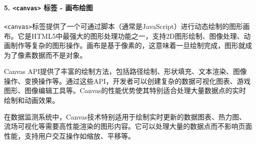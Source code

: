 \paragraph{\texorpdfstring{5. \texttt{\textless{}canvas\textgreater{}} 标签 - 画布绘图}{5. \textless canvas\textgreater{} 标签 - 画布绘图}}\label{canvas-ux6807ux7b7e---ux753bux5e03ux7ed8ux56fe}

\texttt{\textless{}canvas\textgreater{}}标签提供了一个可通过脚本（通常是JavaScript）进行动态绘制的图形画布。它是HTML5中最强大的图形处理功能之一，支持2D图形绘制、图像处理、动画制作等复杂的图形操作。画布是基于像素的，这意味着一旦绘制完成，图形就成为了像素数据而不是对象。

Canvas API提供了丰富的绘制方法，包括路径绘制、形状填充、文本渲染、图像操作、变换操作等。通过这些API，开发者可以创建复杂的数据可视化图表、游戏图形、图像编辑工具等。Canvas的性能优势使其特别适合处理大量数据点的实时绘制和动画效果。

在数据监测系统中，Canvas技术特别适用于绘制实时更新的数据图表、热力图、流场可视化等需要高性能渲染的图形内容。它可以处理大量的数据点而不影响页面性能，支持用户交互操作如缩放、平移等。

